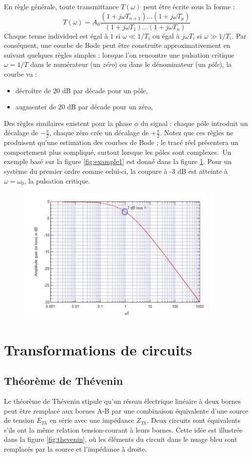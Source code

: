 En règle générale, toute transmittance $T(\omega)$ peut être écrite sous la forme :
$$
T(\omega) = A_0 \frac{(1 + j \omega T_{n+1}) \ldots (1 + j \omega T_{p})}{(1 + j \omega T_{1}) \ldots (1 + j \omega T_{n})}
$$
Chaque terme individuel est égal à $1$ si $\omega \ll 1/T_i$ ou égal à $j \omega T_i$ si $\omega \gg 1/T_i$. Par conséquent, une courbe de Bode peut être construite approximativement en suivant quelques règles simples : lorsque l'on rencontre une pulsation critique $\omega = 1/T$ dans le numérateur (un \emph{zéro}) ou dans le dénominateur (un \emph{pôle}), la courbe va :
\begin{itemize}
	\item décroître de $20$ dB par décade pour un pôle,
	\item augmenter de $20$ dB par décade pour un zéro,
\end{itemize}
Des règles similaires existent pour la phase $\phi$ du signal : chaque pôle introduit un décalage de $-\frac{\pi}{2}$, chaque zéro crée un décalage de $+\frac{\pi}{2}$. Notez que ces règles ne produisent qu'une estimation des courbes de Bode ; le tracé réel présentera un comportement plus compliqué, surtout lorsque les pôles sont complexes.\
Un exemple basé sur la figure \ref{fig:example1} est donné dans la figure \ref{fig:bode1}. Pour un système du premier ordre comme celui-ci, la coupure à -$3$ dB est atteinte à $\omega = \omega_0$, la pulsation critique.
\begin{figure}[h!]
	\centering
	\includegraphics[width=10cm]{figures/ch00/bode.jpg}
	\caption{}
	\label{fig:bode1}
\end{figure}

\section{Transformations de circuits}
\subsection{Théorème de Thévenin}
Le théorème de Thévenin stipule qu'un réseau électrique linéaire à deux bornes peut être remplacé aux bornes A-B par une combinaison équivalente d'une source de tension $E_{Th}$ en série avec une impédance $Z_{Th}$. Deux circuits sont équivalents s'ils ont la même relation tension-courant à leurs bornes. Cette idée est illustrée dans la figure \ref{fig:thevenin}, où les éléments du circuit dans le nuage bleu sont remplacés par la source et l'impédance à droite.

